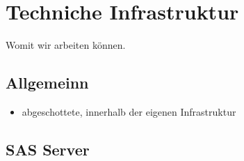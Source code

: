 \documentclass[
  german,
  10pt,
  twoside]{article}
\makeatletter
\providecommand{\tightlist}{%
  \setlength{\itemsep}{0pt}\setlength{\parskip}{0pt}}
\newcommand{\berlintime}{%
  \berlinhr=\time\relax
  \divide\berlinhr by 60\relax
  \berlinmin=\time\relax
  \multiply\berlinhr by -60\relax
  \advance\berlinmin by \berlinhr\relax
  \berlinhr=\time\relax
  \divide\berlinhr by 60\relax
  \advance\berlinhr by 1\relax
  \ifnum\berlinhr>23\relax
    \advance\berlinhr by -24\relax
  \fi
  \ifnum\berlinhr<10 0\fi\the\berlinhr:\ifnum\berlinmin<10 0\fi\the\berlinmin%
}
\newif\ifdraftmode
\providecommand{\totalchars}{0}
\providecommand{\totalwords}{0}
\providecommand{\abstractchars}{0}
\providecommand{\abstractwords}{0}
\providecommand{\zusammenfassungchars}{0}
\providecommand{\zusammenfassungwords}{0}
\providecommand{\footnotecountnum}{0}
\providecommand{\citationcountnum}{0}
\newcommand{\doctitle}{$title$}
\newcommand{\docauthors}{$author-short$}
\newcommand{\docpublication}{$publication$}
\newcommand{\docpublicationissue}{$publication-issue$}
\newcommand{\metadatapage}{%
  \clearpage
  \thispagestyle{empty}
  \onecolumn
  \vspace*{1.5cm}
  
  {\raggedright
  {\LARGE\bfseries\color{wistaBlue} Dokument-Metadaten}\\[0.5cm]
  
  \begin{tabular}{@{}ll}
    \textbf{Titel:} & \doctitle \\[0.3em]
    \textbf{Autoren:} & \docauthors \\[0.3em]
    \textbf{Veröffentlichung:} & \docpublication\ \docpublicationissue \\[0.3em]
    \textbf{Erstellungsdatum:} & \today\ um \berlintime\ Uhr \\[0.3em]
  \end{tabular}
  
  \vspace{0.5cm}
  {\color{wistaBlue}\rule{\textwidth}{1pt}}
  \par}
  
  \vspace{1cm}
  
  {\large\bfseries\color{wistaDarkGray} Dokumentstatistik}\\[0.5cm]
  
  \small
  \begin{tabular}{@{}lrrrrrr@{}}
    \toprule
    \textbf{Abschnitt} & \textbf{Wörter} & \textbf{Zeichen} & \textbf{Fußn.} & \textbf{Quellen} & \textbf{Vorgabe} \\
    \midrule
    Insgesamt & \textcolor{wistaBlue}{\textbf{\totalwords}} & \textcolor{wistaBlue}{\textbf{\totalchars}} & \textcolor{wistaBlue}{\textbf{\footnotecountnum}} & \textcolor{wistaBlue}{\textbf{\citationcountnum}} & 30\,000 Z. \\
    Zusammenfassung & \textcolor{wistaBlue}{\textbf{\zusammenfassungwords}} & \textcolor{wistaBlue}{\textbf{\zusammenfassungchars}} & --- & --- & 800 Z. \\
    Abstract & \textcolor{wistaBlue}{\textbf{\abstractwords}} & \textcolor{wistaBlue}{\textbf{\abstractchars}} & --- & --- & 700 Z. \\
    \midrule
    \sectionrows
    \bottomrule
  \end{tabular}
  \normalsize
  
  \vspace{0.5cm}
  
  {\large\bfseries\color{wistaDarkGray} Schlüsselwörter}\\[0.3cm]
  \small
  \schlusselworterlist
  \normalsize
  
  \vspace{0.5cm}
  
  {\large\bfseries\color{wistaDarkGray} Keywords}\\[0.3cm]
  \small
  \keywordslist
  \normalsize
  
  \vspace{1cm}
  
  {\large\bfseries\color{wistaDarkGray} Tabellen}\\[0.3cm]
  
  \small
  \begin{tabular}{@{}lp{12cm}@{}}
    \toprule
    \textbf{Nr.} & \textbf{Beschreibung} \\
    \midrule
    \tablerows
    \bottomrule
  \end{tabular}
  \normalsize
  
  \vspace{1cm}
  
  {\large\bfseries\color{wistaDarkGray} Abbildungen}\\[0.3cm]
  
  \small
  \begin{tabular}{@{}lp{12cm}@{}}
    \toprule
    \textbf{Nr.} & \textbf{Beschreibung} \\
    \midrule
    \figurerows
    \bottomrule
  \end{tabular}
  \normalsize
  
  \clearpage
}
\makeatother
\begin{document}
\newcommand{\tablerows}{            \hyperref[tbl-pkg-versions]{Tabelle~1} & Versionen verfügbarer R-Packages \\
            \hyperref[tbl-baseline]{Tabelle~2} & Baselines in SAS und Stata (anhand 1\% des simuliertes BTP) \\
            \hyperref[tbl-benchmark-small]{Tabelle~3} & Performanz Messungen für die Fallzahlberechnung anhand 1\% des BTP \\
            \hyperref[tbl-benchmark-regr-small]{Tabelle~4} & Performanz Messungen für die Regressionsberechnung anhand 1\% des BTP \\
            \hyperref[tbl-benchmark]{Tabelle~5} & Performanz Messungen für die Fallzahlberechnung anhand 10\% des BTP \\
            \hyperref[tbl-benchmark-regr]{Tabelle~6} & Performanz Messungen für die Regressionsberechnung anhand 10\% des BTP \\
            \hyperref[tbl-bm-cnt-small]{Tabelle~7} & Benchmarkergebnisse für Fallzahlen (kleine Stichproben des BTP) \\
            \hyperref[tbl-bm-reg-small]{Tabelle~8} & Benchmarkergebnisse für Regression (kleine Stichproben des BTP) \\
}
\newcommand{\figurerows}{            \hyperref[fig-optimization-strategies]{Abbildung~1} & Strategien zur Performanz-Optimierung im FDZ-Bund \\
}
\newcommand{\schlusselworterlist}{}
\newcommand{\keywordslist}{}
\ifdraftmode
\metadatapage
\fi

\section{Techniche Infrastruktur}\label{sec-infrastruktur}

Womit wir arbeiten können.

\subsection{Allgemeinn}\label{allgemeinn}

\begin{itemize}
\tightlist
\item
  abgeschottete, innerhalb der eigenen Infrastruktur
\end{itemize}

\subsection{SAS Server}\label{sas-server}
\end{document}
